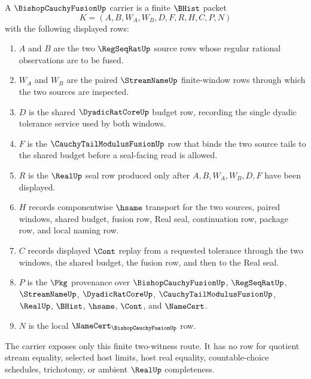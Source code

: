 \begin{definition}
\label{def:bishop-cauchy-fusion-carrier}
A $\BishopCauchyFusionUp$ carrier is a finite $\BHist$ packet
$$
K=(A,B,W_A,W_B,D,F,R,H,C,P,N)
$$
with the following displayed rows:
\begin{enumerate}
\item $A$ and $B$ are the two $\RegSeqRatUp$ source rows whose regular rational observations are to be fused.
\item $W_A$ and $W_B$ are the paired $\StreamNameUp$ finite-window rows through which the two sources are inspected.
\item $D$ is the shared $\DyadicRatCoreUp$ budget row, recording the single dyadic tolerance service used by both windows.
\item $F$ is the $\CauchyTailModulusFusionUp$ row that binds the two source tails to the shared budget before a seal-facing read is allowed.
\item $R$ is the $\RealUp$ seal row produced only after $A,B,W_A,W_B,D,F$ have been displayed.
\item $H$ records componentwise $\hsame$ transport for the two sources, paired windows, shared budget, fusion row, Real seal, continuation row, package row, and local naming row.
\item $C$ records displayed $\Cont$ replay from a requested tolerance through the two windows, the shared budget, the fusion row, and then to the Real seal.
\item $P$ is the $\Pkg$ provenance over $\BishopCauchyFusionUp$, $\RegSeqRatUp$, $\StreamNameUp$, $\DyadicRatCoreUp$, $\CauchyTailModulusFusionUp$, $\RealUp$, $\BHist$, $\hsame$, $\Cont$, and $\NameCert$.
\item $N$ is the local $\NameCert_{\BishopCauchyFusionUp}$ row.
\end{enumerate}
The carrier exposes only this finite two-witness route. It has no row for quotient stream equality, selected host limits, host real equality, countable-choice schedules, trichotomy, or ambient $\RealUp$ completeness.
\end{definition}


